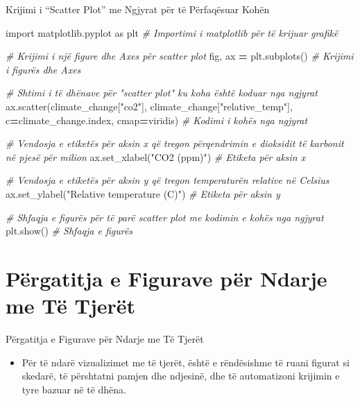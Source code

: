 \documentclass[
  ignorenonframetext,
]{beamer}
\newenvironment{Shaded}{\begin{snugshade}}{\end{snugshade}}
\newcommand{\CommentTok}[1]{\textcolor[rgb]{0.56,0.35,0.01}{\textit{#1}}}
\newcommand{\ImportTok}[1]{#1}
\newcommand{\NormalTok}[1]{#1}
\newcommand{\OperatorTok}[1]{\textcolor[rgb]{0.81,0.36,0.00}{\textbf{#1}}}
\newcommand{\StringTok}[1]{\textcolor[rgb]{0.31,0.60,0.02}{#1}}
\providecommand{\tightlist}{%
  \setlength{\itemsep}{0pt}\setlength{\parskip}{0pt}}
\begin{document}
\begin{frame}[fragile]{Krijimi i ``Scatter Plot'' me Ngjyrat për të
Përfaqësuar Kohën}
\protect\hypertarget{krijimi-i-scatter-plot-me-ngjyrat-puxebr-tuxeb-puxebrfaquxebsuar-kohuxebn-1}{}

\begin{Shaded}
\begin{Highlighting}[]
\ImportTok{import}\NormalTok{ matplotlib.pyplot }\ImportTok{as}\NormalTok{ plt  }\CommentTok{\# Importimi i matplotlib për të krijuar grafikë}

\CommentTok{\# Krijimi i një figure dhe Axes për scatter plot}
\NormalTok{fig, ax }\OperatorTok{=}\NormalTok{ plt.subplots()  }\CommentTok{\# Krijimi i figurës dhe Axes}

\CommentTok{\# Shtimi i të dhënave për "scatter plot" ku koha është koduar nga ngjyrat}
\NormalTok{ax.scatter(climate\_change[}\StringTok{"co2"}\NormalTok{], climate\_change[}\StringTok{"relative\_temp"}\NormalTok{], c}\OperatorTok{=}\NormalTok{climate\_change.index, cmap}\OperatorTok{=}\StringTok{\textquotesingle{}viridis\textquotesingle{}}\NormalTok{)  }\CommentTok{\# Kodimi i kohës nga ngjyrat}

\CommentTok{\# Vendosja e etiketës për aksin x që tregon përqendrimin e dioksidit të karbonit në pjesë për milion}
\NormalTok{ax.set\_xlabel(}\StringTok{"CO2 (ppm)"}\NormalTok{)  }\CommentTok{\# Etiketa për aksin x}

\CommentTok{\# Vendosja e etiketës për aksin y që tregon temperaturën relative në Celsius}
\NormalTok{ax.set\_ylabel(}\StringTok{"Relative temperature (C)"}\NormalTok{)  }\CommentTok{\# Etiketa për aksin y}

\CommentTok{\# Shfaqja e figurës për të parë scatter plot me kodimin e kohës nga ngjyrat}
\NormalTok{plt.show()  }\CommentTok{\# Shfaqja e figurës}
\end{Highlighting}
\end{Shaded}
\end{frame}

\hypertarget{puxebrgatitja-e-figurave-puxebr-ndarje-me-tuxeb-tjeruxebt}{%
\section{Përgatitja e Figurave për Ndarje me Të
Tjerët}\label{puxebrgatitja-e-figurave-puxebr-ndarje-me-tuxeb-tjeruxebt}}

\begin{frame}{Përgatitja e Figurave për Ndarje me Të Tjerët}
\protect\hypertarget{puxebrgatitja-e-figurave-puxebr-ndarje-me-tuxeb-tjeruxebt-1}{}
\begin{itemize}
\tightlist
\item
  Për të ndarë vizualizimet me të tjerët, është e rëndësishme të ruani
  figurat si skedarë, të përshtatni pamjen dhe ndjesinë, dhe të
  automatizoni krijimin e tyre bazuar në të dhëna.
\end{itemize}
\end{frame}
\end{document}
